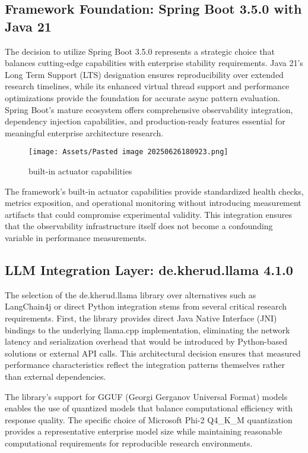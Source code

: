 \subsection{Framework Foundation: Spring Boot 3.5.0 with Java 21}

The decision to utilize Spring Boot 3.5.0 represents a strategic choice that balances cutting-edge capabilities with enterprise stability requirements. Java 21's Long Term Support (LTS) designation ensures reproducibility over extended research timelines, while its enhanced virtual thread support and performance optimizations provide the foundation for accurate async pattern evaluation. Spring Boot's mature ecosystem offers comprehensive observability integration, dependency injection capabilities, and production-ready features essential for meaningful enterprise architecture research.

\begin{figure}[H]
    \centering
    \texttt{[image: Assets/Pasted image 20250626180923.png]}
    \caption{built-in actuator capabilities}
\end{figure}
The framework's built-in actuator capabilities provide standardized health checks, metrics exposition, and operational monitoring without introducing measurement artifacts that could compromise experimental validity. This integration ensures that the observability infrastructure itself does not become a confounding variable in performance measurements.

\subsection{LLM Integration Layer: de.kherud.llama 4.1.0}

The selection of the de.kherud.llama library over alternatives such as LangChain4j or direct Python integration stems from several critical research requirements. First, the library provides direct Java Native Interface (JNI) bindings to the underlying llama.cpp implementation, eliminating the network latency and serialization overhead that would be introduced by Python-based solutions or external API calls. This architectural decision ensures that measured performance characteristics reflect the integration patterns themselves rather than external dependencies.

The library's support for GGUF (Georgi Gerganov Universal Format) models enables the use of quantized models that balance computational efficiency with response quality. The specific choice of Microsoft Phi-2 Q4\_K\_M quantization provides a representative enterprise model size while maintaining reasonable computational requirements for reproducible research environments.


